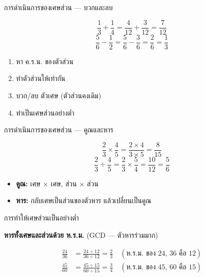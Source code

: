 \documentclass[11pt, aspectratio=169]{beamer}
\begin{document}
\begin{frame}{การดำเนินการของเศษส่วน — บวกและลบ}
  \begin{exambox}
    \[
      \frac{1}{3} + \frac{1}{4} = \frac{4}{12} + \frac{3}{12} = \frac{7}{12}
    \]
    \[
      \frac{5}{6} - \frac{1}{2} = \frac{5}{6} - \frac{3}{6} = \frac{2}{6} = \frac{1}{3}
    \]
  \end{exambox}

  \begin{intuition}[ขั้นตอน]
    \begin{enumerate}
      \item หา ค.ร.น. ของตัวส่วน
      \item ทำตัวส่วนให้เท่ากัน
      \item บวก/ลบ ตัวเศษ (ตัวส่วนคงเดิม)
      \item ทำเป็นเศษส่วนอย่างตํ่า
    \end{enumerate}
  \end{intuition}
\end{frame}

\begin{frame}{การดำเนินการของเศษส่วน — คูณและหาร}
  \begin{exambox}
    \[
      \frac{2}{3} \times \frac{4}{5} = \frac{2 \times 4}{3 \times 5} = \frac{8}{15}
    \]
    \[
      \frac{2}{3} \div \frac{4}{5} = \frac{2}{3} \times \frac{5}{4} = \frac{10}{12} = \frac{5}{6}
    \]
  \end{exambox}

  \begin{intuition}[เคล็ดลับ]
    \begin{itemize}
      \item \textbf{คูณ:} เศษ $\times$ เศษ, ส่วน $\times$ ส่วน
      \item \textbf{หาร:} กลับเศษเป็นส่วนของตัวหาร แล้วเปลี่ยนเป็นคูณ
    \end{itemize}
  \end{intuition}
\end{frame}

\begin{frame}{การทำให้เศษส่วนเป็นอย่างตํ่า}
  \begin{explanation}[วิธีทำ]
    \textbf{หารทั้งเศษและส่วนด้วย ห.ร.ม.} (GCD — ตัวหารร่วมมาก)
  \end{explanation}

  \begin{exambox}[ตัวอย่าง]
    \begin{align*}
      \frac{24}{36} &= \frac{24 \div 12}{36 \div 12} = \frac{2}{3} \quad (\text{ห.ร.ม. ของ 24, 36 คือ 12}) \\[1em]
      \frac{45}{60} &= \frac{45 \div 15}{60 \div 15} = \frac{3}{4} \quad (\text{ห.ร.ม. ของ 45, 60 คือ 15})
    \end{align*}
  \end{exambox}
\end{frame}
\end{document}

